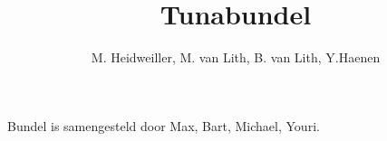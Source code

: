 \documentclass[11pt,a4paper,twoside]{article}
\title{Tunabundel}
\author{M. Heidweiller, M. van Lith, B. van Lith, Y.Haenen}
\begin{document}
\noindent




\renewcommand\contentsname{List of awesomeness.}
\tableofcontents
{}
\vfill
Bundel is samengesteld door Max, Bart, Michael, Youri.
\clearpage

\raggedright






%


%

%
%
%


%

\end{document}
